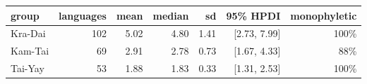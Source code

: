 
\begin{tabular}[t]{lrrrrrr}
\toprule
group & languages & mean & median & sd & 95\% HPDI & monophyletic\\
\midrule
Kra-Dai & 102 & 5.02 & 4.80 & 1.41 & {}[2.73, 7.99] & 100\%\\
Kam-Tai & 69 & 2.91 & 2.78 & 0.73 & {}[1.67, 4.33] & 88\%\\
Tai-Yay & 53 & 1.88 & 1.83 & 0.33 & {}[1.31, 2.53] & 100\%\\
\bottomrule
\end{tabular}
